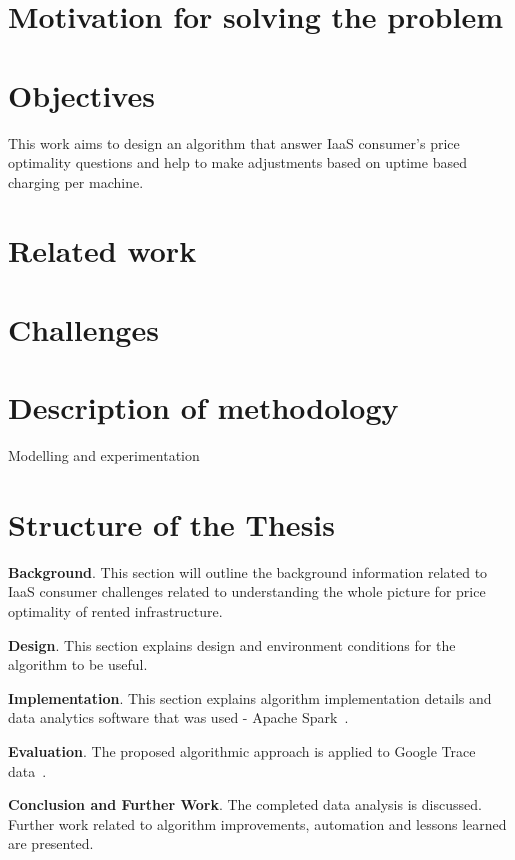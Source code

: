 \documentclass[]{final_report}
\begin{document}
\section{Motivation for solving the problem}

\section{Objectives}
This work aims to design an algorithm that answer IaaS consumer's price optimality questions and help to make adjustments based on uptime based charging per machine. 

\section{Related work}

\section{Challenges}

\section{Description of methodology}
Modelling and experimentation

\section{Structure of the Thesis}
\textbf{Background}. This section will outline the background information related to IaaS consumer challenges related to understanding the whole picture for price optimality of rented infrastructure. \par
\textbf{Design}. This section explains design and environment conditions for the algorithm to be useful. \par
\textbf{Implementation}. This section explains algorithm implementation details and data analytics software that was used - Apache Spark~\cite{spark}. \par
\textbf{Evaluation}. The proposed algorithmic approach is applied to Google Trace data~\cite{googleTrace}. \par
\textbf{Conclusion and Further Work}. The completed data analysis is discussed. Further work related to algorithm improvements, automation and lessons learned are presented. 
 
\newpage

\end{document}
